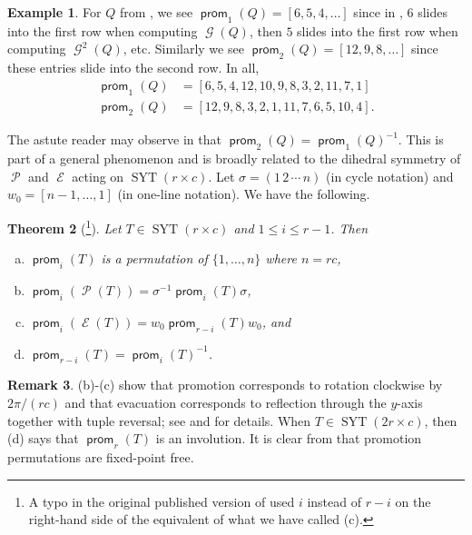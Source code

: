 \documentclass{amsart}
\newtheorem{theorem}{Theorem}[section]
\theoremstyle{definition}
\newtheorem{remark}[theorem]{Remark}
\newtheorem{example}[theorem]{Example}
\DeclareMathOperator{\SYT}{SYT}
\DeclareMathOperator{\prom}{\mathsf{prom}}
\DeclareMathOperator{\gromotion}{\mathcal{G}}
\DeclareMathOperator{\promotion}{\mathcal{P}}
\DeclareMathOperator{\evacuation}{\mathcal{E}}
\begin{document}
\begin{example}\label{ex:prom-sliding}
    For $Q$ from , we see $\prom_1(Q) = [6, 5, 4, \ldots]$ since in , $6$ slides into the first row when computing $\gromotion(Q)$, then $5$ slides into the first row when computing $\gromotion^2(Q)$, etc. Similarly we see $\prom_2(Q) = [12, 9, 8, \ldots]$ since these entries slide into the second row. In all,
    \begin{align*}
        \prom_1(Q) &= [6, 5, 4, 12, 10, 9, 8, 3, 2, 11, 7, 1] \\
        \prom_2(Q) &= [12, 9, 8, 3, 2, 1, 11, 7, 6, 5, 10, 4].
    \end{align*}
\end{example}

The astute reader may observe in  that $\prom_2(Q) = \prom_1(Q)^{-1}$. This is part of a general phenomenon and is broadly related to the dihedral symmetry of $\promotion$ and $\evacuation$ acting on $\SYT(r \times c)$. Let $\sigma = (1\,2\,\cdots\,n)$ (in cycle notation) and $w_0 = [n-1, \ldots, 1]$ (in one-line notation). We have the following.

\begin{theorem}[{\cite[Thm.~6.7]{fluctuating-paper}}\protect\footnote{A typo in the original published version of \cite[Thm.~6.7]{fluctuating-paper} used $i$ instead of $r-i$ on the right-hand side of the equivalent of what we have called (c).}]\label{thm:prom-perm-symmetries}
    Let $T \in \SYT(r \times c)$ and $1 \leq i \leq r-1$. Then
    \begin{enumerate}[(a)]
        \item $\prom_i(T)$ is a permutation of $\{1, \ldots, n\}$ where $n = rc$,
        \item $\prom_i(\promotion(T)) = \sigma^{-1} \prom_i(T) \sigma$,
        \item $\prom_i(\evacuation(T)) = w_0 \prom_{r-i}(T) w_0$, and
        \item $\prom_{r-i}(T) = \prom_i(T)^{-1}$.
    \end{enumerate}
\end{theorem}

\begin{remark}
    (b)-(c) show that promotion corresponds to rotation clockwise by $2\pi/(rc)$ and that evacuation corresponds to reflection through the $y$-axis together with tuple reversal; see \cite[\S7]{fluctuating-paper} and  for details. When $T \in \SYT(2r \times c)$, then (d) says that $\prom_r(T)$ is an involution. It is clear from  that promotion permutations are fixed-point free.
\end{remark}
\end{document}
